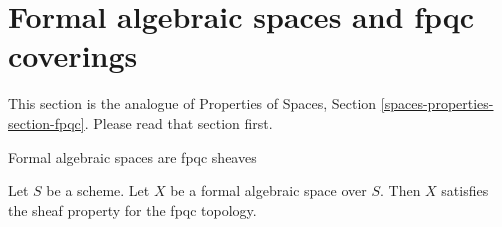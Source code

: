\section{Formal algebraic spaces and fpqc coverings}
\label{section-fpqc}

\noindent
This section is the analogue of Properties of Spaces, Section
\ref{spaces-properties-section-fpqc}. Please read that section
first.

\begin{lemma}
\label{lemma-sheaf-fpqc}
\begin{slogan}
Formal algebraic spaces are fpqc sheaves
\end{slogan}
Let $S$ be a scheme. Let $X$ be a formal algebraic space over $S$. Then
$X$ satisfies the sheaf property for the fpqc topology.
\end{lemma}

